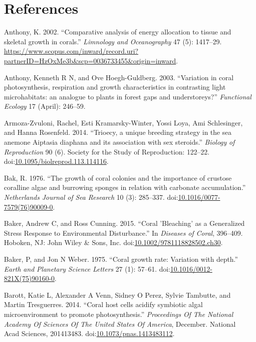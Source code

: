 \documentclass[]{elsarticle} %
\begin{document}
\section*{References}\label{references}

\hypertarget{refs}{}
\hypertarget{ref-Anthony:2002tc}{}
Anthony, K. 2002. ``Comparative analysis of energy allocation to tissue
and skeletal growth in corals.'' \emph{Limnology and Oceanography} 47
(5): 1417--29.
\url{https://www.scopus.com/inward/record.uri?partnerID=HzOxMe3b\&scp=0036733455\&origin=inward}.

\hypertarget{ref-Anthony:2003p3632}{}
Anthony, Kenneth R N, and Ove Hoegh-Guldberg. 2003. ``Variation in coral
photosynthesis, respiration and growth characteristics in contrasting
light microhabitats: an analogue to plants in forest gaps and
understoreys?'' \emph{Functional Ecology} 17 (April): 246--59.

\hypertarget{ref-ArmozaZvuloni:2014ju}{}
Armoza-Zvuloni, Rachel, Esti Kramarsky-Winter, Yossi Loya, Ami
Schlesinger, and Hanna Rosenfeld. 2014. ``Trioecy, a unique breeding
strategy in the sea anemone Aiptasia diaphana and its association with
sex steroids.'' \emph{Biology of Reproduction} 90 (6). Society for the
Study of Reproduction: 122--22.
doi:\href{https://doi.org/10.1095/biolreprod.113.114116}{10.1095/biolreprod.113.114116}.

\hypertarget{ref-Bak:1976bv}{}
Bak, R. 1976. ``The growth of coral colonies and the importance of
crustose coralline algae and burrowing sponges in relation with
carbonate accumulation.'' \emph{Netherlands Journal of Sea Research} 10
(3): 285--337.
doi:\href{https://doi.org/10.1016/0077-7579(76)90009-0}{10.1016/0077-7579(76)90009-0}.

\hypertarget{ref-Baker:2015kp}{}
Baker, Andrew C, and Ross Cunning. 2015. ``Coral 'Bleaching' as a
Generalized Stress Response to Environmental Disturbance.'' In
\emph{Diseases of Coral}, 396--409. Hoboken, NJ: John Wiley \& Sons,
Inc.
doi:\href{https://doi.org/10.1002/9781118828502.ch30}{10.1002/9781118828502.ch30}.

\hypertarget{ref-Baker:1975ip}{}
Baker, P, and Jon N Weber. 1975. ``Coral growth rate: Variation with
depth.'' \emph{Earth and Planetary Science Letters} 27 (1): 57--61.
doi:\href{https://doi.org/10.1016/0012-821X(75)90160-0}{10.1016/0012-821X(75)90160-0}.

\hypertarget{ref-Barott:2014gx}{}
Barott, Katie L, Alexander A Venn, Sidney O Perez, Sylvie Tambutte, and
Martin Tresguerres. 2014. ``Coral host cells acidify symbiotic algal
microenvironment to promote photosynthesis.'' \emph{Proceedings Of The
National Academy Of Sciences Of The United States Of America}, December.
National Acad Sciences, 201413483.
doi:\href{https://doi.org/10.1073/pnas.1413483112}{10.1073/pnas.1413483112}.
\end{document}
